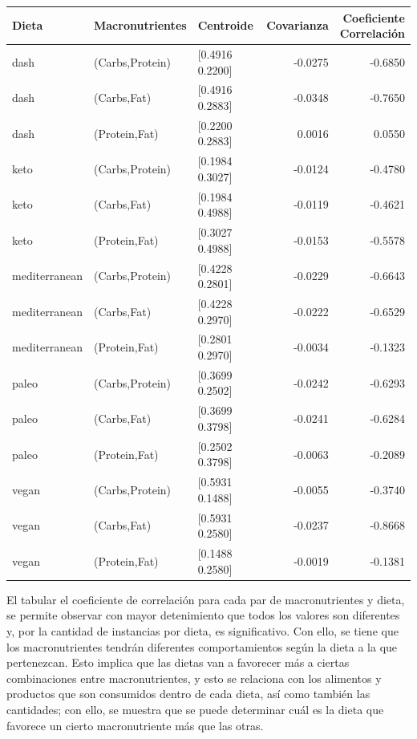 \documentclass[12pt,a4paper]{article}
\begin{document}
{        \begin{center}
            \begin{tabular}{lllrr}
            \toprule
                Dieta & Macronutrientes & Centroide & Covarianza & \makecell{Coeficiente\\Correlación} \\
            \midrule
                dash          & (Carbs,Protein) & [0.4916 0.2200] & -0.0275 & -0.6850 \\
                dash          & (Carbs,Fat)     & [0.4916 0.2883] & -0.0348 & -0.7650 \\
                dash          & (Protein,Fat)   & [0.2200 0.2883] &  0.0016 &  0.0550 \\
                keto          & (Carbs,Protein) & [0.1984 0.3027] & -0.0124 & -0.4780 \\
                keto          & (Carbs,Fat)     & [0.1984 0.4988] & -0.0119 & -0.4621 \\
                keto          & (Protein,Fat)   & [0.3027 0.4988] & -0.0153 & -0.5578 \\
                mediterranean & (Carbs,Protein) & [0.4228 0.2801] & -0.0229 & -0.6643 \\
                mediterranean & (Carbs,Fat)     & [0.4228 0.2970] & -0.0222 & -0.6529 \\
                mediterranean & (Protein,Fat)   & [0.2801 0.2970] & -0.0034 & -0.1323 \\
                paleo         & (Carbs,Protein) & [0.3699 0.2502] & -0.0242 & -0.6293 \\
                paleo         & (Carbs,Fat)     & [0.3699 0.3798] & -0.0241 & -0.6284 \\
                paleo         & (Protein,Fat)   & [0.2502 0.3798] & -0.0063 & -0.2089 \\
                vegan         & (Carbs,Protein) & [0.5931 0.1488] & -0.0055 & -0.3740 \\
                vegan         & (Carbs,Fat)     & [0.5931 0.2580] & -0.0237 & -0.8668 \\
                vegan         & (Protein,Fat)   & [0.1488 0.2580] & -0.0019 & -0.1381 \\
            \bottomrule
            \end{tabular}
        \end{center}
        
        El tabular el coeficiente de correlación para cada par de macronutrientes y dieta, 
        se permite observar con mayor detenimiento que todos los valores son diferentes y,  
        por la cantidad de instancias por dieta, es significativo. Con ello, se tiene que 
        los macronutrientes tendrán diferentes comportamientos según la dieta a la que 
        pertenezcan. Esto implica que las dietas van a favorecer más a ciertas combinaciones 
        entre macronutrientes, y esto se relaciona con los alimentos y productos que son 
        consumidos dentro de cada dieta, así como también las cantidades; con ello, se 
        muestra que se puede determinar cuál es la dieta que favorece un cierto macronutriente 
        más que las otras.

}
\end{document}
